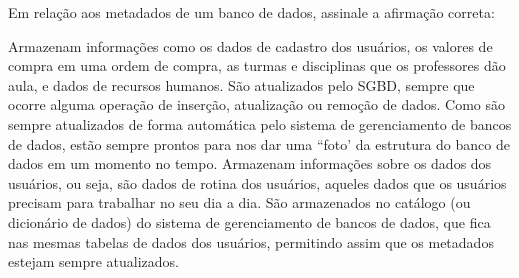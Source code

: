 \documentclass[12pt, addpoints]{exam}
\begin{document}
    \begin{questions}

    \newpage
    \question

Em relação aos metadados de um banco de dados, assinale a afirmação correta:
\begin{choices}
\choice Armazenam informações como os dados de cadastro dos usuários, os valores de compra em uma ordem de compra, as turmas e disciplinas que os professores dão aula, e dados de recursos humanos.
\choice São atualizados pelo SGBD, sempre que ocorre alguma operação de inserção, atualização ou remoção de dados.
\choice Como são sempre atualizados de forma automática pelo sistema de gerenciamento de bancos de dados, estão sempre prontos para nos dar uma ``foto' da estrutura do banco de dados em um momento no tempo.
\choice Armazenam informações sobre os dados dos usuários, ou seja, são dados de rotina dos usuários, aqueles dados que os usuários precisam para trabalhar no seu dia a dia.
\choice São armazenados no catálogo (ou dicionário de dados) do sistema de gerenciamento de bancos de dados, que fica nas mesmas tabelas de dados dos usuários, permitindo assim que os metadados estejam sempre atualizados.
\end{choices}



    \end{questions}
    
\end{document}
